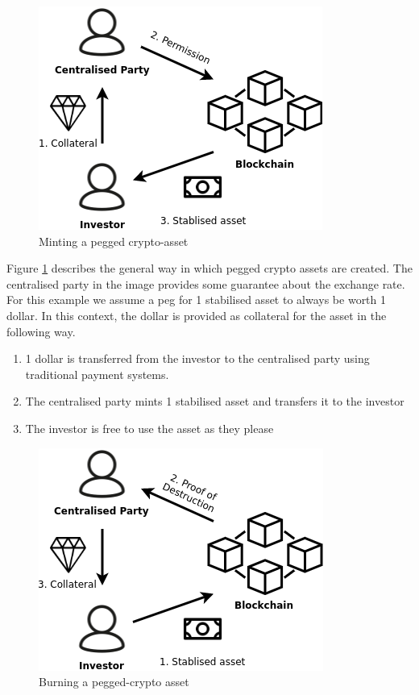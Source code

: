 \documentclass[english,]{IEEEtran}
\providecommand{\tightlist}{%
  \setlength{\itemsep}{0pt}\setlength{\parskip}{0pt}}
\begin{document}
\begin{figure}
\centering
\includegraphics{img/Centralised_create.png}
\caption{Minting a pegged crypto-asset \label{cent_create_label}}
\end{figure}

Figure \ref{cent_create_label} describes the general way in which pegged
crypto assets are created. The centralised party in the image provides
some guarantee about the exchange rate. For this example we assume a peg
for 1 stabilised asset to always be worth 1 dollar. In this context, the
dollar is provided as collateral for the asset in the following way.

\begin{enumerate}
\def\labelenumi{\arabic{enumi}.}
\tightlist
\item
  1 dollar is transferred from the investor to the centralised party
  using traditional payment systems.
\item
  The centralised party mints 1 stabilised asset and transfers it to the
  investor
\item
  The investor is free to use the asset as they please
\end{enumerate}

\begin{figure}
\centering
\includegraphics{img/Centralised_destroy.png}
\caption{Burning a pegged-crypto asset \label{cent_destoy_label}}
\end{figure}
\end{document}
